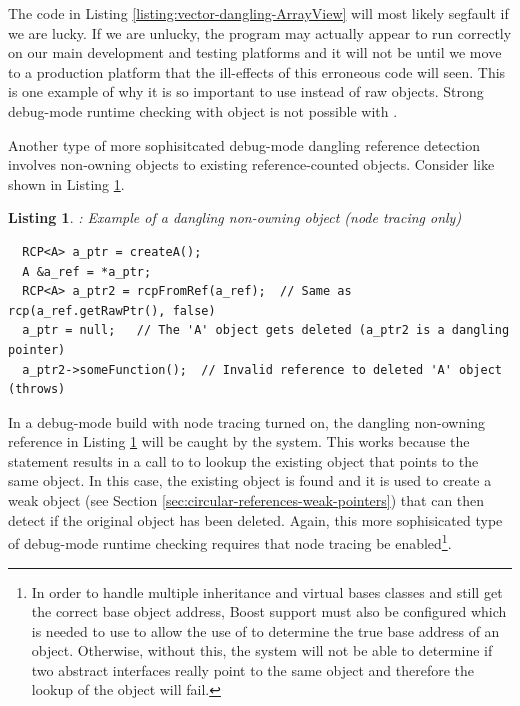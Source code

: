 \documentclass[pdf,ps2pdf,11pt]{SANDreport}
\newtheorem{listing}{Listing}
\begin{document}
The code in Listing {}\ref{listing:vector-dangling-ArrayView} will
most likely segfault if we are lucky.  If we are unlucky, the program
may actually appear to run correctly on our main development and
testing platforms and it will not be until we move to a production
platform that the ill-effects of this erroneous code will seen.  This
is one example of why it is so important to use {}
instead of raw {} objects.  Strong debug-mode
runtime checking with {} object is not possible with
{}.

Another type of more sophisitcated debug-mode dangling reference
detection involves non-owning {} objects to existing
reference-counted objects.  Consider like shown in Listing
{}\ref{listing:RCP-nonowning-dangling-ref}.

\begin{listing}: Example of a dangling non-owning {} object
(node tracing only) \\
\label{listing:RCP-nonowning-dangling-ref}
{\small\begin{verbatim}
  RCP<A> a_ptr = createA();
  A &a_ref = *a_ptr;
  RCP<A> a_ptr2 = rcpFromRef(a_ref);  // Same as rcp(a_ref.getRawPtr(), false)
  a_ptr = null;   // The 'A' object gets deleted (a_ptr2 is a dangling pointer)
  a_ptr2->someFunction();  // Invalid reference to deleted 'A' object (throws)
\end{verbatim}}
\end{listing}

In a debug-mode build with node tracing turned on, the dangling
non-owning {} reference in Listing
{}\ref{listing:RCP-nonowning-dangling-ref} will be caught by the
system.  This works because the statement
{} results in a call to
{} to lookup the
existing {} object that points to the same
{} object.  In this case, the existing {}
object is found and it is used to create a weak {} object
(see Section {}\ref{sec:circular-references-weak-pointers}) that can
then detect if the original {} object has been deleted.
Again, this more sophisicated type of debug-mode runtime checking
requires that node tracing be enabled\footnote{In order to handle
multiple inheritance and virtual bases classes and still get the
correct base object address, Boost support must also be configured
which is needed to use {} to allow the
use of {} to determine the true base
address of an object.  Otherwise, without this, the system will not be
able to determine if two abstract interfaces really point to the same
object and therefore the lookup of the {} object will
fail.}.
\end{document}
